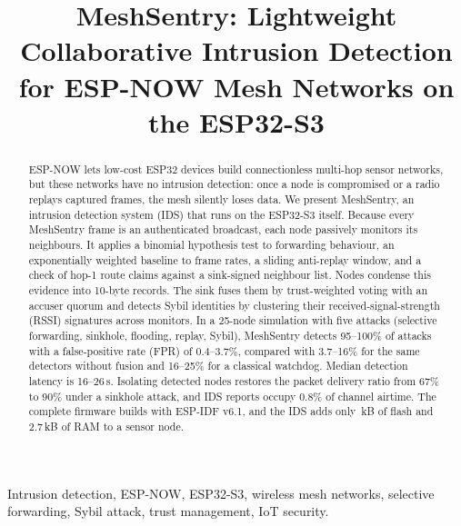 \documentclass[conference]{IEEEtran}
\newcommand{\todo}[1]{\textcolor{red}{[TODO: #1]}}
\begin{document}
\title{MeshSentry: Lightweight Collaborative Intrusion Detection for ESP-NOW Mesh Networks on the ESP32-S3}

\author{
\IEEEauthorblockA{\todo{Department}, \todo{University}\\
\todo{City, Country}\\
nabil.litayem@gmail.com}}

\maketitle

\begin{abstract}
ESP-NOW lets low-cost ESP32 devices build connectionless multi-hop sensor
networks, but these networks have no intrusion detection: once a node is
compromised or a radio replays captured frames, the mesh silently loses data.
We present MeshSentry, an intrusion detection system (IDS) that runs on the
ESP32-S3 itself. Because every MeshSentry frame is an authenticated broadcast,
each node passively monitors its neighbours. It applies a binomial hypothesis
test to forwarding behaviour, an exponentially weighted baseline to frame rates,
a sliding anti-replay window, and a check of hop-1 route claims against a
sink-signed neighbour list. Nodes condense this evidence into 10-byte records.
The sink fuses them by trust-weighted voting with an accuser quorum and
detects Sybil identities by clustering their received-signal-strength (RSSI)
signatures across monitors. In a 25-node simulation with five attacks (selective forwarding,
sinkhole, flooding, replay, Sybil), MeshSentry detects 95--100\% of attacks
with a false-positive rate (FPR) of 0.4--3.7\%, compared with 3.7--16\% for the
same detectors without fusion and 16--25\% for a classical watchdog. Median
detection latency is 16--26\,s. Isolating detected nodes restores the packet
delivery ratio from 67\% to 90\% under a sinkhole attack, and IDS reports
occupy 0.8\% of channel airtime. The complete firmware builds with ESP-IDF
v6.1, and the IDS adds only \FPIdsNodeFlash\,kB of flash and 2.7\,kB of RAM to a sensor node.
\end{abstract}

\begin{IEEEkeywords}
Intrusion detection, ESP-NOW, ESP32-S3, wireless mesh networks, selective forwarding, Sybil attack, trust management, IoT security.
\end{IEEEkeywords}

\end{document}
